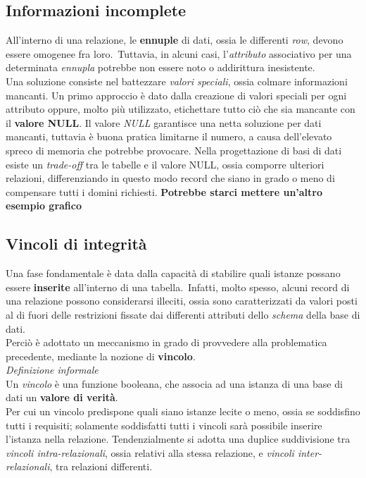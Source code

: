 \documentclass{article}
\begin{document}
\subsection*{Informazioni incomplete}
\large
All'interno di una relazione, le \textbf{ennuple} di dati, ossia le differenti \textit{row}, devono essere omogenee fra loro.\ Tuttavia, in alcuni casi, l'\textit{attributo} associativo per una determinata \textit{ennupla} potrebbe non essere noto o addirittura inesistente.\vspace{14pt}\\
Una soluzione consiste nel battezzare \textit{valori speciali}, ossia colmare informazioni mancanti. Un primo approccio è dato dalla creazione di valori speciali per ogni attributo oppure, molto più utilizzato, etichettare tutto ciò che sia mancante con il \textbf{valore NULL}.
Il valore \textit{NULL} garantisce una netta soluzione per dati mancanti, tuttavia è buona pratica limitarne il numero, a causa dell'elevato spreco di memoria che potrebbe provocare. Nella progettazione di basi di dati esiste un \textit{trade-off} tra le tabelle e il valore NULL, ossia comporre ulteriori relazioni, differenziando in questo modo record che siano in grado o meno di compensare tutti i domini richiesti.
\textbf{Potrebbe starci mettere un'altro esempio grafico}

\subsection*{Vincoli di integrità}
\large
Una fase fondamentale è data dalla capacità di stabilire quali istanze possano essere \textbf{inserite} all'interno di una tabella.\ Infatti, molto spesso, alcuni record di una relazione possono considerarsi illeciti, ossia sono caratterizzati da valori posti al di fuori delle restrizioni fissate dai differenti attributi dello \textit{schema} della base di dati.\vspace{14pt}\\
Perciò è adottato un meccanismo in grado di provvedere alla problematica precedente, mediante la nozione di \textbf{vincolo}.\vspace{14pt}\\ 
\textit{Definizione informale}\\Un \textit{vincolo} è una funzione booleana, che associa ad una istanza di una base di dati un \textbf{valore di verità}.\vspace{14pt}\\
Per cui un vincolo predispone quali siano istanze lecite o meno, ossia se soddisfino tutti i requisiti; solamente soddisfatti tutti i vincoli sarà possibile inserire l'istanza nella relazione. Tendenzialmente si adotta una duplice suddivisione tra \textit{vincoli intra-relazionali}, ossia relativi alla stessa relazione, e \textit{vincoli inter-relazionali}, tra relazioni differenti.
\end{document}
